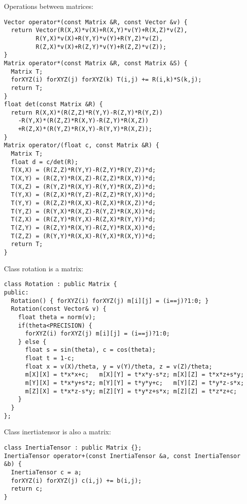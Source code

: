 \noindent
Operations between matrices: \begin{lstlisting}
Vector operator*(const Matrix &R, const Vector &v) {
  return Vector(R(X,X)*v(X)+R(X,Y)*v(Y)+R(X,Z)*v(Z),
		 R(Y,X)*v(X)+R(Y,Y)*v(Y)+R(Y,Z)*v(Z),
		 R(Z,X)*v(X)+R(Z,Y)*v(Y)+R(Z,Z)*v(Z));
}
Matrix operator*(const Matrix &R, const Matrix &S) {
  Matrix T;
  forXYZ(i) forXYZ(j) forXYZ(k) T(i,j) += R(i,k)*S(k,j);
  return T;
}
float det(const Matrix &R) {
  return R(X,X)*(R(Z,Z)*R(Y,Y)-R(Z,Y)*R(Y,Z))
    -R(Y,X)*(R(Z,Z)*R(X,Y)-R(Z,Y)*R(X,Z))
    +R(Z,X)*(R(Y,Z)*R(X,Y)-R(Y,Y)*R(X,Z));
}
Matrix operator/(float c, const Matrix &R) {
  Matrix T;
  float d = c/det(R);
  T(X,X) = (R(Z,Z)*R(Y,Y)-R(Z,Y)*R(Y,Z))*d;
  T(X,Y) = (R(Z,Y)*R(X,Z)-R(Z,Z)*R(X,Y))*d;
  T(X,Z) = (R(Y,Z)*R(X,Y)-R(Y,Y)*R(X,Z))*d;
  T(Y,X) = (R(Z,X)*R(Y,Z)-R(Z,Z)*R(Y,X))*d;
  T(Y,Y) = (R(Z,Z)*R(X,X)-R(Z,X)*R(X,Z))*d;
  T(Y,Z) = (R(Y,X)*R(X,Z)-R(Y,Z)*R(X,X))*d;
  T(Z,X) = (R(Z,Y)*R(Y,X)-R(Z,X)*R(Y,Y))*d;
  T(Z,Y) = (R(Z,Y)*R(X,Y)-R(Z,Y)*R(X,X))*d;
  T(Z,Z) = (R(Y,Y)*R(X,X)-R(Y,X)*R(X,Y))*d;
  return T;
}
\end{lstlisting}
\noindent
Class rotation is a matrix: \begin{lstlisting}
class Rotation : public Matrix {
public:
  Rotation() { forXYZ(i) forXYZ(j) m[i][j] = (i==j)?1:0; }
  Rotation(const Vector& v) {
    float theta = norm(v);    
    if(theta<PRECISION) {
      forXYZ(i) forXYZ(j) m[i][j] = (i==j)?1:0;
    } else {
      float s = sin(theta), c = cos(theta);
      float t = 1-c;
      float x = v(X)/theta, y = v(Y)/theta, z = v(Z)/theta;
      m[X][X] = t*x*x+c;   m[X][Y] = t*x*y-s*z; m[X][Z] = t*x*z+s*y;
      m[Y][X] = t*x*y+s*z; m[Y][Y] = t*y*y+c;   m[Y][Z] = t*y*z-s*x;
      m[Z][X] = t*x*z-s*y; m[Z][Y] = t*y*z+s*x; m[Z][Z] = t*z*z+c;
    }
  }
};
\end{lstlisting}
\noindent
Class inertiatensor is also a matrix: \begin{lstlisting}
class InertiaTensor : public Matrix {};
InertiaTensor operator+(const InertiaTensor &a, const InertiaTensor &b) {
  InertiaTensor c = a;
  forXYZ(i) forXYZ(j) c(i,j) += b(i,j);
  return c;
}
\end{lstlisting}
\noindent
